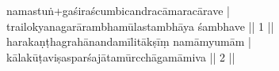 \documentclass{article}
\begin{document}
namastuṅ+gaśiraścumbicandracāmaracārave |\\
trailokyanagarārambhamūlastambhāya śambhave || 1 ||\\
harakaṇṭhagrahānandamīlitākṣīṃ namāmyumām |\\
kālakūṭaviṣasparśajātamūrcchāgamāmiva || 2 ||
\end{document}
